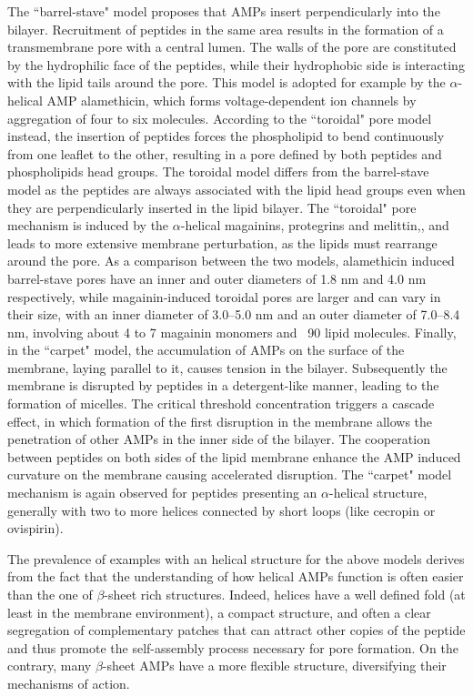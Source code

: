 \documentclass[a4paper,11pt]{extreport}
\begin{document}
The ``barrel-stave" model proposes that AMPs insert perpendicularly into the bilayer. Recruitment of peptides in the same area results in the formation of a transmembrane pore with a central lumen. The walls of the pore are constituted by the hydrophilic face of the peptides, while their hydrophobic side is interacting with the lipid tails around the pore. This model is adopted for example by the $\alpha$-helical AMP alamethicin, which forms voltage-dependent ion channels by aggregation of four to six molecules.\cite{Bertelsen2012,Yang2001,Lee2004,Spaar2004} According to the ``toroidal" pore model instead, the insertion of peptides forces the phospholipid to bend continuously from one leaflet to the other, resulting in a pore defined by both peptides and phospholipids head groups. The toroidal model differs from the barrel-stave model as the peptides are always associated with the lipid head groups even when they are perpendicularly inserted in the lipid  bilayer.
%
The ``toroidal" pore mechanism is induced by the $\alpha$-helical magainins, protegrins and melittin,\cite{Yang2001,Matsuzaki1996,Hallock2003}, and leads to more extensive membrane perturbation, as the lipids must rearrange around the pore.\cite{Bertelsen2012}
%
As a comparison between the two models, alamethicin induced barrel-stave pores have an inner and outer diameters of 1.8 nm and 4.0 nm respectively,\cite{Spaar2004,He1995} while magainin-induced toroidal pores are larger and can vary in their size, with an inner diameter of 3.0–5.0 nm and an outer diameter of 7.0–8.4 nm, involving about 4 to 7 magainin monomers and ~90 lipid molecules.\cite{Matsuzaki1998,Matsuzaki1997}
%
Finally, in the ``carpet" model, the accumulation of AMPs on the surface of the membrane, laying parallel to it, causes tension in the bilayer. Subsequently the membrane is disrupted by peptides in a detergent-like manner, leading to the formation of micelles.\cite{Shai1999,Ladokhin2001}
%
The critical threshold concentration triggers a cascade effect, in which formation of the first disruption in the membrane allows the penetration of other AMPs in the inner side of the bilayer. The cooperation between peptides on both sides of the lipid membrane enhance the AMP induced curvature on the membrane causing accelerated disruption.\cite{Oren1998}
%
The ``carpet" model mechanism is again observed for peptides presenting an $\alpha$-helical structure, generally with two to more helices connected by short loops (like cecropin\cite{Gazit1995} or ovispirin\cite{Yamaguchi2001}).

The prevalence of examples with an helical structure for the above models derives from the fact that the understanding of how helical AMPs function is often easier than the one of $\beta$-sheet rich structures.
%
Indeed, helices have a well defined fold (at least in the membrane environment), a compact structure, and often a clear segregation of complementary patches that can attract other copies of the peptide and thus promote the self-assembly process necessary for pore formation. On the contrary, many $\beta$-sheet AMPs have a more flexible structure, diversifying their mechanisms of action.\cite{??}
\end{document}
